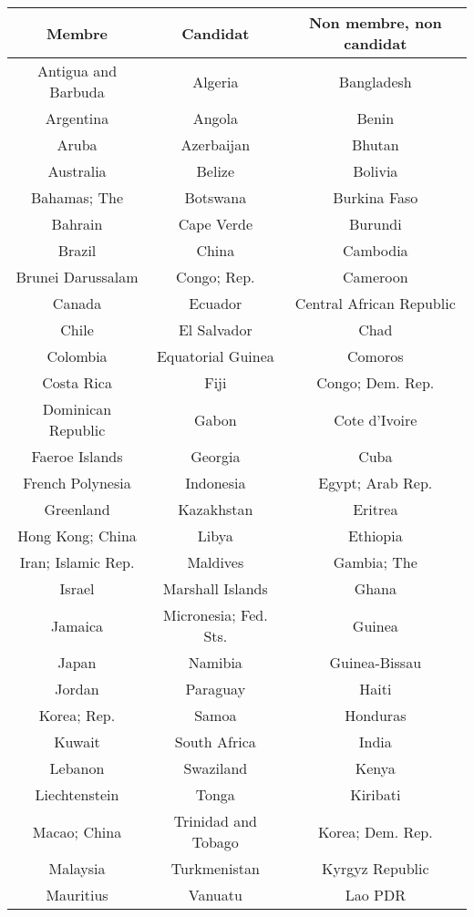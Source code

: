 \begin{center}
\begin{longtable}{|c|c|c|}
\hline
{\bf Membre}&{\bf Candidat}&{\bf Non membre, non candidat}\\
\endhead
\hline
Antigua and Barbuda&Algeria&Bangladesh\\
\hline
Argentina&Angola&Benin\\
\hline
Aruba&Azerbaijan&Bhutan\\
\hline
Australia&Belize&Bolivia\\
\hline
Bahamas; The&Botswana&Burkina Faso\\
\hline
Bahrain&Cape Verde&Burundi\\
\hline
Brazil&China&Cambodia\\
\hline
Brunei Darussalam&Congo; Rep.&Cameroon\\
\hline
Canada&Ecuador&Central African Republic\\
\hline
Chile&El Salvador&Chad\\
\hline
Colombia&Equatorial Guinea&Comoros\\
\hline
Costa Rica&Fiji&Congo; Dem. Rep.\\
\hline
Dominican Republic&Gabon&Cote d'Ivoire\\
\hline
Faeroe Islands&Georgia&Cuba\\
\hline
French Polynesia&Indonesia&Egypt; Arab Rep.\\
\hline
Greenland&Kazakhstan&Eritrea\\
\hline
Hong Kong; China&Libya&Ethiopia\\
\hline
Iran; Islamic Rep.&Maldives&Gambia; The\\
\hline
Israel&Marshall Islands&Ghana\\
\hline
Jamaica&Micronesia; Fed. Sts.&Guinea\\
\hline
Japan&Namibia&Guinea-Bissau\\
\hline
Jordan&Paraguay&Haiti\\
\hline
Korea; Rep.&Samoa&Honduras\\
\hline
Kuwait&South Africa&India\\
\hline
Lebanon&Swaziland&Kenya\\
\hline
Liechtenstein&Tonga&Kiribati\\
\hline
Macao; China&Trinidad and Tobago&Korea; Dem. Rep.\\
\hline
Malaysia&Turkmenistan&Kyrgyz Republic\\
\hline
Mauritius&Vanuatu&Lao PDR\\

\end{longtable}
\end{center}
